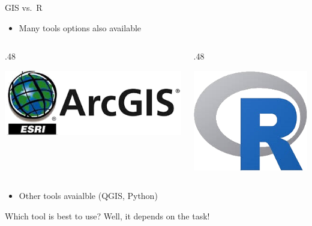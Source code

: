 \documentclass[10pt,ignorenonframetext,]{beamer}
\providecommand{\tightlist}{%
  \setlength{\itemsep}{0pt}\setlength{\parskip}{0pt}}
\def\begincols{\begin{columns}}
\def\begincol{\begin{column}}
\def\endcol{\end{column}}
\def\endcols{\end{columns}}
\begin{document}
\begin{frame}{GIS vs.~R}

\begin{itemize}
\tightlist
\item
  Many tools options also available
\end{itemize}

\begincols
\begincol{.48\textwidth}

\begin{center}\includegraphics[width=0.8\linewidth]{../images/arcgis} \end{center}

\endcol
\begincol{.48\textwidth}

\begin{center}\includegraphics[width=0.5\linewidth]{../images/RLogo} \end{center}

\endcol
\endcols

\begin{itemize}
\tightlist
\item
  Other tools avaialble (QGIS, Python)
\end{itemize}

\begin{alertblock}{Which tool is best to use?}
Well, it depends on the task!
\end{alertblock}

\end{frame}
\end{document}
